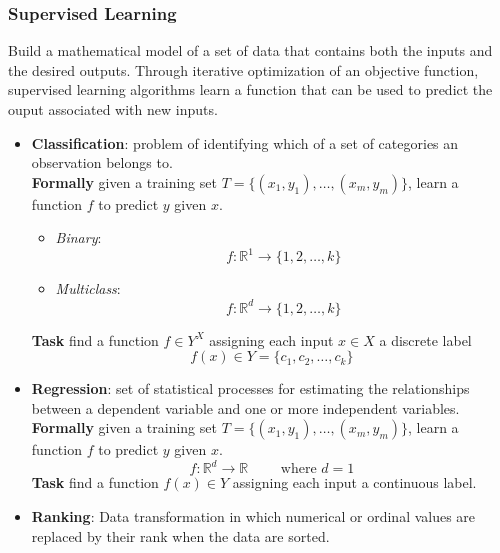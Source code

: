 \documentclass[a4paper,6pt,twocolumn,fleqn]{article}
\begin{document}
\subsubsection{Supervised Learning} %
Build a mathematical model of a set of data that contains both the inputs and the desired outputs. Through iterative optimization of an objective function, supervised learning algorithms learn a function that can be used to predict the ouput associated
with new inputs.
\begin{itemize}
    \item \textbf{Classification}: problem of identifying which of a set of categories an observation belongs to.\\
    \textbf{Formally} given a training set \(T = \{(x_1, y_1), \ldots , (x_m,y_m)\}\), learn a function \(f\) to predict \(y\) given \(x\).
    \begin{itemize}
        \item \emph{Binary}: 
        \begin{equation}
            f: \mathbb R^1 \to \{1, 2, \ldots, k\}
        \end{equation}
        \item \emph{Multiclass}: 
        \begin{equation}
            f: \mathbb R^d \to \{1, 2, \ldots, k\}
        \end{equation}
    \end{itemize}
    \textbf{Task} find a function \(f \in Y^X\) assigning each input \(x \in X\) a discrete label
    \begin{equation}
        f(x) \in Y = \{c_1, c_2, \ldots, c_k\}
    \end{equation}
    \item \textbf{Regression}: set of statistical processes for estimating the relationships between a dependent variable and one or more independent variables.\\
    \textbf{Formally} given a training set \(T = \{(x_1, y_1), \ldots , (x_m,y_m)\}\), learn a function \(f\) to predict \(y\) given \(x\).
    \begin{equation}
        f: \mathbb R^d \to \mathbb R \qquad \text{ where } d=1
    \end{equation}
    \textbf{Task} find a function \(f(x) \in Y\) assigning each input a continuous label.
    \item \textbf{Ranking}: Data transformation in which numerical or ordinal values are replaced by their rank when the data are sorted.
\end{itemize}
\end{document}
